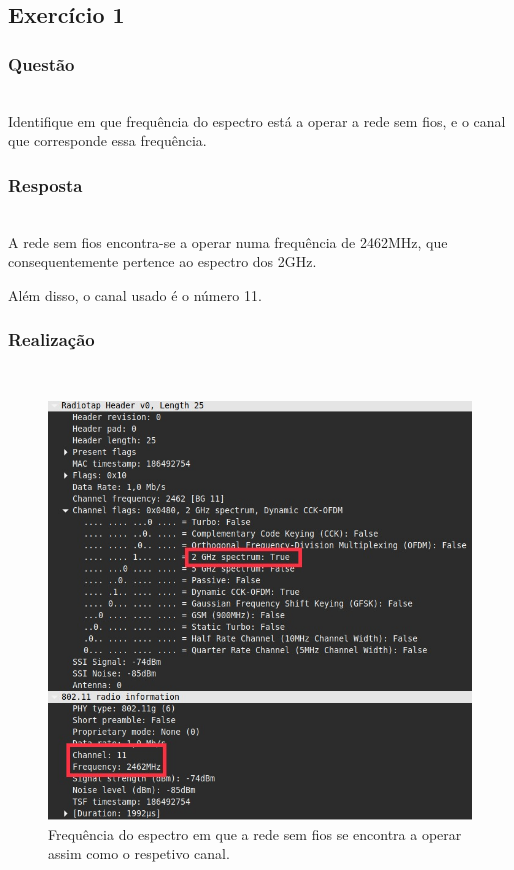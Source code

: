 \documentclass{llncs}
\begin{document}
\subsection{Exercício 1}
\subsubsection{Questão}\rule[-10pt]{0pt}{10pt}\\

Identifique em que frequência do espectro está a operar a rede sem fios, e o canal que corresponde essa frequência.

\subsubsection{Resposta}\rule[-10pt]{0pt}{10pt}\\

A rede sem fios encontra-se a operar numa frequência de 2462MHz, que consequentemente pertence ao espectro dos 2GHz. 

Além disso, o canal usado é o número 11.

\subsubsection{Realização}\rule[-10pt]{0pt}{10pt}\\

\begin{figure}
  \begin{center}
  \includegraphics[scale=0.35]{./imagens/ex1.png} 
  \end{center}
  \caption{Frequência do espectro em que a rede sem fios se encontra a operar assim como o respetivo canal.}
  \label{fig:freq}
\end{figure}
\end{document}
